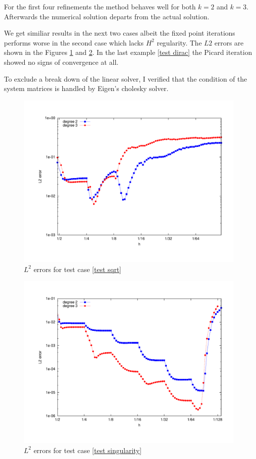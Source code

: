  For the first four refinements the method behaves well for both $k=2$ and $k=3$. Afterwards the numerical solution departs from the actual solution.
 
 We get similiar results in the next two cases albeit the fixed point iterations performs worse in the second case which lacks $H^2$ regularity. The $L2$ errors are shown in the Figures \ref{fig: l2 errors test sqrt ourMethod} and \ref{fig: l2 errors test singularity ourMethod}. In the last example \ref{test dirac} the Picard iteration showed no signs of convergence at all.

To exclude a break down of the linear solver, I verified that the condition of the system matrices is handled by Eigen's cholesky solver.
 
\begin{figure}[H]
\centering
	\includegraphics[scale =0.4]{plots/MA3.pdf}
	\caption{$L^2$ errors for test case \ref{test sqrt}}
	\label{fig: l2 errors test sqrt ourMethod}
\end{figure}


\begin{figure}[H]
\centering
	\includegraphics[scale =0.4]{plots/MA2.pdf}
	\caption{$L^2$ errors for test case \ref{test singularity}}
	\label{fig: l2 errors test singularity ourMethod}
\end{figure}



